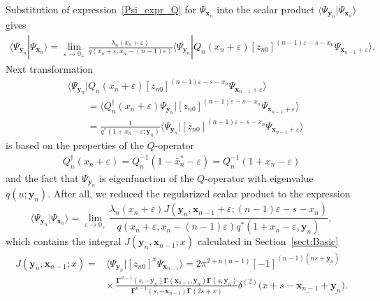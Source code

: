 \documentclass[pdftex]{sigma}
\numberwithin{equation}{section}
\begin{document}
Substitution of expression~\eqref{Psi_expr_Q} for $\Psi_{\bm{x}_n}$ into
the scalar product $\langle \Psi_{\bm{y}_n} | \Psi_{\bm{x}_n} \rangle$ gives
\begin{align*}
	\langle \Psi_{\bm{y}_n} | \Psi_{\bm{x}_n} \rangle =
	\lim\limits_{\varepsilon\to 0_+}
	\frac{\lambda_n(x_n+\varepsilon)}{q(x_n+\varepsilon, x_n-(n-1)\varepsilon)}
	 \bigl\langle \Psi_{\bm{y}_n} |
	Q_n(x_n+\varepsilon) [z_{n0}]^{(n-1)\varepsilon-s-x_n}
	\Psi_{\bm{x}_{n-1}+\varepsilon} \bigr\rangle .
\end{align*}
Next transformation
\begin{align*}
&\bigl\langle \Psi_{\bm{y}_n} |
Q_n(x_n+\varepsilon) [z_{n0}]^{(n-1)\varepsilon-s-x_n}
\Psi_{\bm{x}_{n-1}+\varepsilon}\bigr\rangle \\
& \qquad= \bigl\langle Q_n^\dagger(x_n+\varepsilon) \Psi_{\bm{y}_n} |
[z_{n0}]^{(n-1)\varepsilon-s-x_n}
\Psi_{\bm{x}_{n-1}+\varepsilon}\bigr\rangle \\
& \qquad =
\frac{1}{q^\ast(1+x_n-\varepsilon; \bm{y}_n)} \bigl\langle \Psi_{\bm{y}_n} |
[z_{n0}]^{(n-1)\varepsilon-s-x_n}
\Psi_{\bm{x}_{n-1}+\varepsilon}\bigr\rangle
\end{align*}
is based on the properties of the $Q$-operator
\begin{align*}
Q_n^\dagger(x_n+\varepsilon) = Q_n^{-1}(1-\bar{x}_n^\ast-\varepsilon) =
Q_n^{-1}(1+x_n-\varepsilon)
\end{align*}
and the fact that $\Psi_{\bm{y}_n}$ is eigenfunction of the
$Q$-operator with eigenvalue $q(u; \bm{y}_n)$.
After all, we reduced the regularized scalar product to the expression
\begin{equation} \label{PsiyPsix2}
	\langle \Psi_{\bm{y}_n} | \Psi_{\bm{x}_n} \rangle =
	\lim\limits_{\varepsilon\to 0_+}
	\frac{\lambda_n(x_n+\varepsilon) J(\bm{y}_n, \bm{x}_{n-1}+\varepsilon; (n-1)\varepsilon-s-x_n)}
	{q(x_n+\varepsilon, x_n-(n-1)\varepsilon)
		q^\ast(1+x_n-\varepsilon,\bm{y}_n)},
\end{equation}
which contains the integral $J(\bm{y}_n,\bm{x}_{n-1}; x)$ calculated in Section~\ref{sect:Basic}
\begin{align*}
J(\bm{y}_n,\bm{x}_{n-1};x) ={}&
\langle\Psi_{\bm{y}_n}|[z_{n0}]^{x} \Psi_{\bm{x}_{n-1}}\rangle =
2\pi^{2+n(n-1)}[-1]^{(n-1)(ns+\underline{\bm{y}_n})} \\
& {\times}\,
\frac{\mathbf{\Gamma}^{n-1}(s ,-\bm{y}_n) \mathbf{\Gamma}(\bm{x}_{n-1},\bm{y}_n)
\mathbf{\Gamma}(s ,\bm{y}_n)}
{\mathbf{\Gamma}^{n-1}(s ,-\bm{x}_{n-1}) \mathbf{\Gamma}(2s+x)}
 \delta^{(2)}\bigl(x+s-\underline{\bm{x}_{n-1}}+\underline{\bm{y}_n}\bigr) .
\end{align*}
\end{document}
